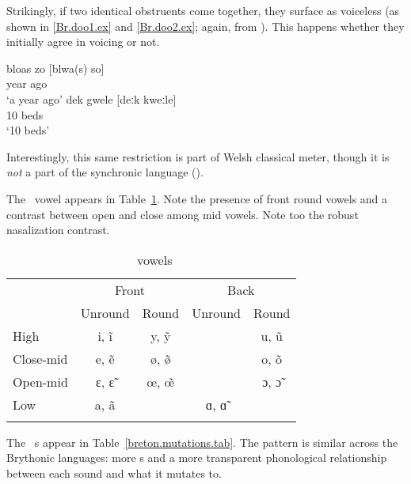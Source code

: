 \documentclass[output=paper,colorlinks,citecolor=brown]{langscibook}
\begin{document}
Strikingly, if two identical obstruents come together, they surface as voiceless (as shown in \ref{Br.doo1.ex} and \ref{Br.doo2.ex}; again, from \cite{hemon}). This happens whether they initially agree in voicing or not.

\ea\label{Br.doo1.ex}
\gll bloas zo {[blwa(s) so]} \\
     year  ago \\
\glt `a year ago'
\ex\label{Br.doo2.ex}
\gll dek gwele {[deːk kweːle]} \\
     10  beds \\
\glt `10 beds'
\z

\noindent {} Interestingly, this same restriction is  part of Welsh classical meter, though it is \emph{not} a part of the synchronic language (\cite{morris, clywed, anghenion}).

The \br\ vowel  appears in Table~\ref{breton.vowels.tab}. Note the presence of front round vowels and a contrast between open and close among mid vowels. Note too the robust nasalization contrast.

\begin{table}
\caption{\br\ vowels}
\label{breton.vowels.tab}
\begin{tabular}[t]{lcccc}
\lsptoprule
          & \multicolumn{2}{c}{Front}    & \multicolumn{2}{c}{Back} \\\cmidrule(lr){2-3}\cmidrule(lr){4-5}
          & Unround     & Round           & Unround     & Round \\
\midrule
High      & i, ĩ         & y, ỹ             &             & u, ũ \\
Close-mid & e, ẽ         & ø, ø̃             &             & o, õ \\
Open-mid  & ɛ, ɛ̃         & œ, œ̃             &             & ɔ, ɔ̃ \\
Low       & a, ã         &                 & ɑ, ɑ̃         &  \\
\lspbottomrule
\end{tabular}
\end{table}

The \br\ \m s appear in Table~\ref{breton.mutations.tab}. The pattern is similar across the Brythonic languages: more \m s and a more transparent phonological relationship between each sound and what it mutates to.
\end{document}
